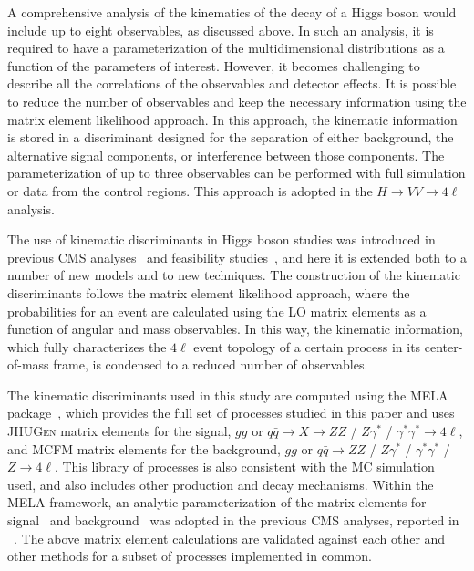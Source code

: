 A comprehensive analysis of the kinematics of the decay of a Higgs boson would include up to eight observables,
as discussed above. In such an analysis, it is required to have a parameterization of the multidimensional
distributions as a function of the parameters of interest. However, it becomes challenging to describe all
the correlations of the observables and detector effects. It is possible to reduce the number of observables
and keep the necessary information using the matrix element likelihood approach.
In this approach, the kinematic information is stored in a discriminant designed for the separation of
either background, the alternative signal components, or interference between those components.
The parameterization of up to three observables can be performed with full simulation or data from
the control regions. This approach is adopted in the $H \to VV \to 4\ell$ analysis.

The use of kinematic discriminants in Higgs boson studies was introduced in
previous CMS analyses~\cite{Chatrchyan:2012ufa,Chatrchyan:2012jja, Chatrchyan:2013mxa,Khachatryan:2014iha}
and feasibility studies~\cite{Bolognesi:2012mm,Anderson:2013afp},
and here it is extended both to a number of new models and to new techniques.
The construction of the kinematic discriminants follows the matrix element likelihood approach,
where the probabilities for an event are calculated using the LO matrix elements as a function
of angular and mass observables. In this way, the kinematic information, which fully characterizes
the $4\ell$ event topology of a certain process in its center-of-mass frame, is condensed to a
reduced number of observables.

The kinematic discriminants used in this study are computed using the \textsc{MELA}
package~\cite{Chatrchyan:2012ufa,Gao:2010qx,Bolognesi:2012mm,Anderson:2013afp},
which provides the full set of processes studied in this paper and uses \textsc{JHUGen} matrix elements
for the  signal,  $gg$ or $q\bar{q}\to X\to ZZ$ / $Z\gamma^*$ / $\gamma^*\gamma^*\to4\ell$,
and \textsc{MCFM} matrix elements for the background,
$gg$ or $q\bar{q}\to ZZ$ / $Z\gamma^*$ / $\gamma^*\gamma^*$ / $Z\to 4\ell$.
This library of processes is also consistent with the MC simulation used, and also includes other production and decay mechanisms.
Within the \textsc{MELA} framework, an analytic parameterization of the matrix elements
for signal~\cite{Gao:2010qx,Bolognesi:2012mm} and background~\cite{Chen:2012jy} was adopted in the previous CMS
analyses, reported in ~\cite{Chatrchyan:2012ufa,Chatrchyan:2013lba,Chatrchyan:2012jja}.
The above matrix element calculations are validated against each other and other methods for a subset of processes implemented in common.

